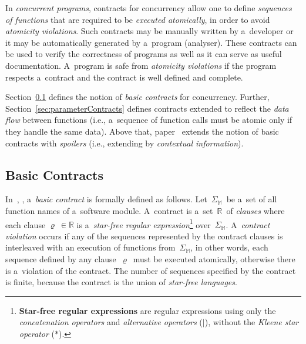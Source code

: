 In \emph{concurrent programs}, contracts for concurrency allow one to define
\emph{sequences of functions} that are required to be \emph{executed 
atomically}, in order to avoid \emph{atomicity violations}. Such contracts 
may be manually written by a~developer or it may be automatically generated 
by a~program (analyser). These contracts can be used to verify the correctness 
of programs as well as it can serve as useful documentation. A~program is 
safe from \emph{atomicity violations} if the program respects a~contract and 
the contract is well defined and complete.

Section~\ref{sec:basicContracts} defines the notion of \emph{basic contracts}
for concurrency. Further, Section~\ref{sec:parameterContracts} defines
contracts extended to reflect the \emph{data flow} between functions (i.e.,
a~sequence of function calls must be atomic only if they handle the
same data). Above that, paper~\cite{contracts2017} extends the notion
of basic contracts with \emph{spoilers} (i.e., extending by
\emph{contextual information}).


\subsection{Basic Contracts}
\label{sec:basicContracts}

In~\cite{contracts2017}, \cite{contracts2015}, a~\emph{basic contract} is 
formally defined as follows. Let~$ \Sigma_\mathbb{M} $~be a~set of all 
function names of a~software module. A~contract is 
a~set~$ \mathbb{R} $~of \emph{clauses} where each clause 
$ \varrho\ \in \mathbb{R} $ is a~\emph{star-free regular
expression}\footnote{\textbf{Star-free regular expressions} are 
regular expressions using only the \emph{concatenation operators} 
and \emph{alternative operators} ($ | $), without the 
\emph{Kleene star operator} ($ * $).} over~$ \Sigma_\mathbb{M} $.
A~\emph{contract violation} occurs if any of the sequences represented by 
the contract clauses is interleaved with an execution of functions 
from~$ \Sigma_\mathbb{M} $, in other words, each sequence defined by
any clause~$ \varrho $~must be executed atomically, otherwise there
is a~violation of the contract. The number of sequences specified by
the contract is finite, because the contract is the union of 
\emph{star-free languages}.

